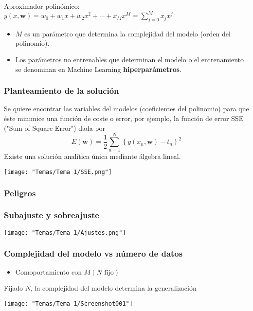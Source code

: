 Aproximador polinómico: $y(x,\mathbf{w})=w_0+w_1x+w_2x^2+\cdots+x_Mx^M=\sum_{j=0}^{M}x_jx^j$

\begin{itemize}
\item $M$ es un parámetro que determina la complejidad del modelo (orden del polinomio).
\item Los parámetros no entrenables que determinan el modelo o el entrenamiento se denominan en Machine Learning \textbf{hiperparámetros}.
\end{itemize}
\subsubsection{Planteamiento de la solución}
Se quiere encontrar las variables del modelos (coeficientes del polinomio) para que éste minimice una función de coste o error, por ejemplo, la función de error SSE ("Sum of Square Error") dada por \[ E(\mathbf{w})=\dfrac{1}{2}\sum_{n=1}^{N}\left\{y(x_n,\mathbf{w})-t_n\right\}^2 \]Existe una solución analítica única mediante álgebra lineal.


\begin{center}
    \texttt{[image: "Temas/Tema 1/SSE.png"]}
\end{center}

\subsubsection{Peligros}
\subsubsection{Subajuste y sobreajuste}

\begin{center}
	\texttt{[image: "Temas/Tema 1/Ajustes.png"]}
\end{center}
\subsubsection{Complejidad del modelo vs número de datos}
\begin{minipage}{0.6\textwidth}
	\begin{itemize}[label=\color{red}\textbullet, leftmargin=*]
		\item \color{lightblue}Comoportamiento con $M(N\text{ fijo})$
	\end{itemize}
	Fijado $N$, la complejidad del modelo determina la generalización
\end{minipage}\qquad\begin{minipage}{0.4\textwidth}
\texttt{[image: "Temas/Tema 1/Screenshot001"]}
\end{minipage}

